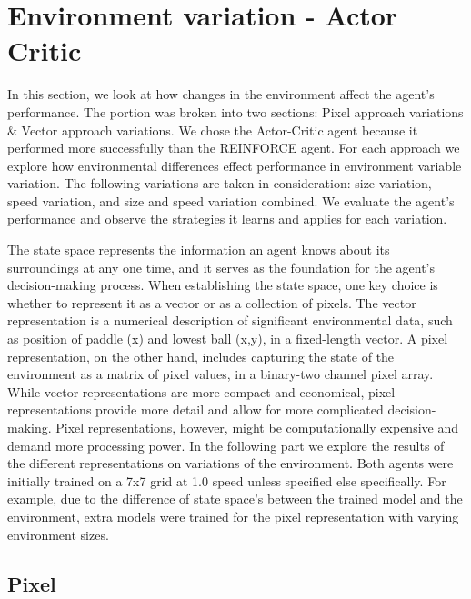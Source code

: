 \documentclass{article}
\begin{document}
\newpage
\section{Environment variation - Actor Critic}
\label{Environment}
In this section, we look at how changes in the environment affect the agent's performance. 
The portion was broken into two sections: Pixel approach variations \& Vector approach variations.
We chose the Actor-Critic agent because it performed more successfully than the REINFORCE agent.
For each approach we explore how environmental differences effect performance in environment variable variation. 
The following variations are taken in consideration: size variation, speed variation, and size and speed variation combined.
We evaluate the agent's performance and observe the strategies it learns and applies for each variation.

The state space represents the information an agent knows about its surroundings at any one time, and it serves as the foundation for the agent's decision-making process. 
When establishing the state space, one key choice is whether to represent it as a vector or as a collection of pixels.
The vector representation is a numerical description of significant environmental data, such as position of paddle (x) and lowest ball (x,y), in a fixed-length vector.
A pixel representation, on the other hand, includes capturing the state of the environment as a matrix of pixel values, in a binary-two channel pixel array.
While vector representations are more compact and economical, pixel representations provide more detail and allow for more complicated decision-making.
Pixel representations, however, might be computationally expensive and demand more processing power.
In the following part we explore the results of the different representations on variations of the environment.
Both agents were initially trained on a 7x7 grid at 1.0 speed unless specified else specifically.
For example, due to the difference of state space's between the trained model and the environment, extra models were trained for the pixel representation with varying environment sizes.


\subsection{Pixel}
\label{ENV-PV}
\end{document}
